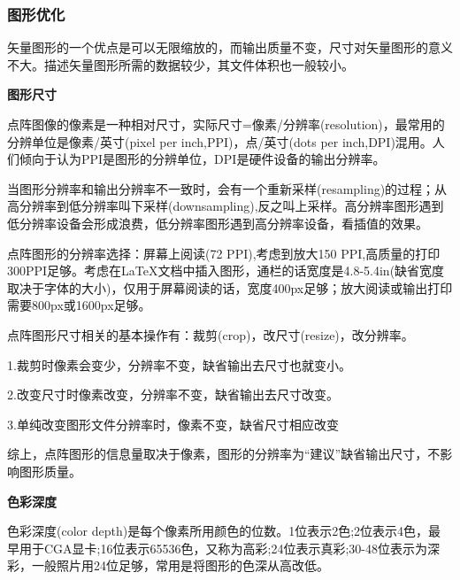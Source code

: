 \documentclass[16pt]{article}
\begin{document}
\subsubsection{图形优化}
    矢量图形的一个优点是可以无限缩放的，而输出质量不变，尺寸对矢量图形的意义不大。描述矢量图形所需的数据较少，其文件体积也一般较小。 \par
\textbf{图形尺寸} \par
    点阵图像的像素是一种相对尺寸，实际尺寸=像素/分辨率(resolution)，最常用的分辨单位是像素/英寸(pixel per inch,PPI)，点/英寸(dots per inch,DPI)混用。人们倾向于认为PPI是图形的分辨单位，DPI是硬件设备的输出分辨率。\par
    当图形分辨率和输出分辨率不一致时，会有一个重新采样(resampling)的过程；从高分辨率到低分辨率叫下采样(downsampling),反之叫上采样。高分辨率图形遇到低分辨率设备会形成浪费，低分辨率图形遇到高分辨率设备，看插值的效果。 \par
    点阵图形的分辨率选择：屏幕上阅读(72 PPI),考虑到放大150 PPI,高质量的打印300PPI足够。考虑在\LaTeX{}文档中插入图形，通栏的话宽度是4.8-5.4in(缺省宽度取决于字体的大小)，仅用于屏幕阅读的话，宽度400px足够；放大阅读或输出打印需要800px或1600px足够。 \par
    点阵图形尺寸相关的基本操作有：裁剪(crop)，改尺寸(resize)，改分辨率。\par
    1.裁剪时像素会变少，分辨率不变，缺省输出去尺寸也就变小。\par
    2.改变尺寸时像素改变，分辨率不变，缺省输出去尺寸改变。\par
    3.单纯改变图形文件分辨率时，像素不变，缺省尺寸相应改变 \par
    综上，点阵图形的信息量取决于像素，图形的分辨率为“建议”缺省输出尺寸，不影响图形质量。\par
    \textbf{色彩深度} \par
    色彩深度(color depth)是每个像素所用颜色的位数。1位表示2色;2位表示4色，最早用于CGA显卡;16位表示65536色，又称为高彩;24位表示真彩;30-48位表示为深彩，一般照片用24位足够，常用是将图形的色深从高改低。\par
\end{document}
